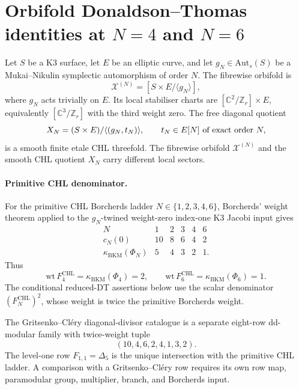 
\providecommand{\kBKM}{\kappa_{\mathrm{BKM}}}
\providecommand{\kch}{\kappa_{\mathrm{ch}}}
\providecommand{\kcat}{\kappa_{\mathrm{cat}}}
\providecommand{\kfib}{\kappa_{\mathrm{fiber}}}
\providecommand{\DTred}{Z^{\mathrm{red}}_{\mathrm{DT}}}
\providecommand{\FCHL}{F^{\mathrm{CHL}}}
\providecommand{\Z}{\mathbb{Z}}
\providecommand{\mult}{\mathrm{mult}}

\section*{Orbifold Donaldson--Thomas identities at
\texorpdfstring{$N=4$ and $N=6$}{N=4 and N=6}}
\label{wn:sec:N46-orbifold-DT}

Let $S$ be a K3 surface, let $E$ be an elliptic curve, and let
$g_N\in\mathrm{Aut}_s(S)$ be a Mukai--Nikulin symplectic automorphism of
order $N$. The fibrewise orbifold is
\[
  \mathcal{X}^{(N)}=[S\times E/\langle g_N\rangle],
\]
where $g_N$ acts trivially on $E$. Its local stabiliser charts are
$[\mathbb{C}^2/\mathbb{Z}_r]\times E$, equivalently
$[\mathbb{C}^3/\mathbb{Z}_r]$ with the third weight zero. The free
diagonal quotient
\[
  X_N=(S\times E)/\langle(g_N,t_N)\rangle,\qquad
  t_N\in E[N]\ \hbox{of exact order }N,
\]
is a smooth finite etale CHL threefold. The fibrewise orbifold
$\mathcal{X}^{(N)}$ and the smooth CHL quotient $X_N$ carry different
local sectors.

\paragraph{Primitive CHL denominator.}
For the primitive CHL Borcherds ladder
$N\in\{1,2,3,4,6\}$, Borcherds' weight theorem applied to the
$g_N$-twined weight-zero index-one K3 Jacobi input gives
\[
\begin{array}{c|ccccc}
N&1&2&3&4&6\\ \hline
c_N(0)&10&8&6&4&2\\
\kBKM(\Phi_N)&5&4&3&2&1 .
\end{array}
\]
Thus
\[
  \mathrm{wt}\,\FCHL_4=\kBKM(\Phi_4)=2,\qquad
  \mathrm{wt}\,\FCHL_6=\kBKM(\Phi_6)=1 .
\]
The conditional reduced-DT assertions below use the scalar denominator
$(\FCHL_N)^2$, whose weight is twice the primitive Borcherds weight.

The Gritsenko--Cl\'ery diagonal-divisor catalogue is a separate eight-row
dd-modular family with twice-weight tuple
\[
  (10,4,6,2,4,1,3,2).
\]
The level-one row $F_{1,1}=\Delta_5$ is the unique intersection with
the primitive CHL ladder. A comparison with a Gritsenko--Cl\'ery row
requires its own row map, paramodular group, multiplier, branch, and
Borcherds input.


